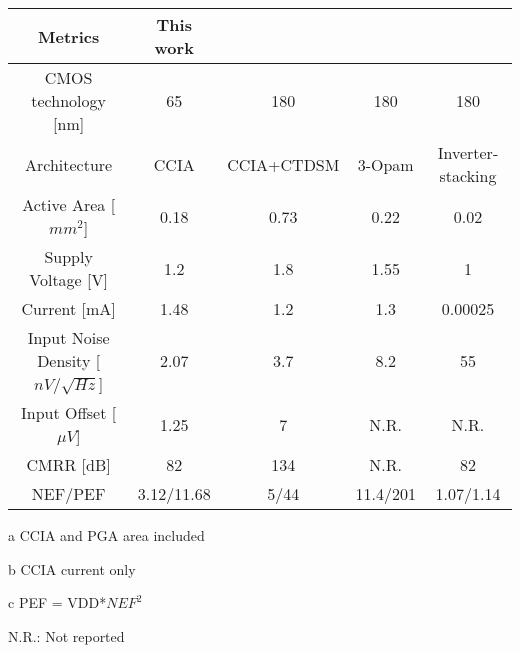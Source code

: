 \documentclass[border=10pt]{standalone}
\begin{document}
\cite{6015500} \cite{CCIA_GMID} \cite{chand-7417924} \cite{herman2024versatility}

\begin{table}
\begin{adjustbox}{width=\linewidth,center}
\begin{threeparttable}
\begin{tabular}{|c|c|c|c|c|}
\hline
Metrics    & This work & \cite{Jiang-8588386}  &  \cite{Maruyama-7516659}  &  \cite{Shen-8008461}   \\ \hline
CMOS technology {[}nm{]}       & 65   & 180    & 180 & 180     \\ \hline
Architecture & CCIA & CCIA+CTDSM & 3-Opam & Inverter-stacking \\ \hline
Active Area  {[}$mm^2${]}    & 0.18\tnote{a} & 0.73  & 0.22  & 0.02      \\ \hline
Supply Voltage {[}V{]} & 1.2 & 1.8 & 1.55 & 1      \\ \hline
Current {[}mA{]} & 1.48\tnote{b}  & 1.2    & 1.3      & 0.00025   \\ \hline
Input Noise Density {[}$nV/\sqrt{Hz}${]}  & 2.07 & 3.7  & 8.2  & 55       \\ \hline
Input Offset {[}$\mu V${]}   & 1.25  & 7 & N.R. & N.R. \\ \hline
CMRR  {[}dB{]}     & 82 & 134   & N.R.  & 82 \\ \hline
NEF/PEF\tnote{c} & 3.12/11.68  & 5/44      & 11.4/201  & 1.07/1.14    \\ \hline
\end{tabular}
    \footnoterule
    \begin{tablenotes}
    {\fontsize{6pt}{7pt}\selectfont
     \item [a] CCIA and PGA area included 
      \item [b] CCIA current only
    \item [c] PEF = VDD*$NEF^2$ 
    \item N.R.: Not reported}
\end{tablenotes}
\end{threeparttable}
\end{adjustbox}
\end{table}

{}

\end{document}
